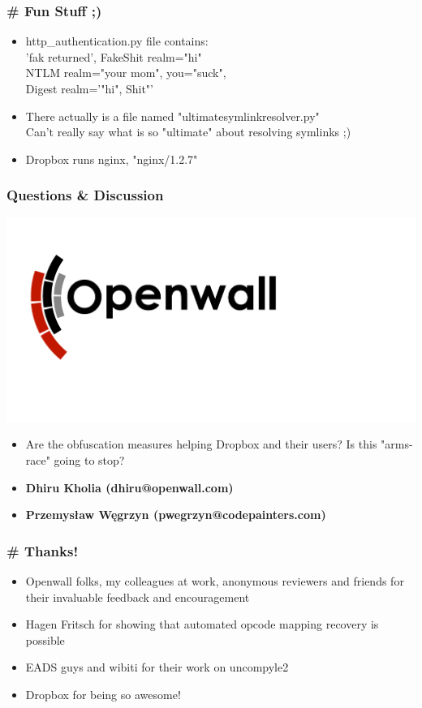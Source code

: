 \documentclass{beamer}
\begin{document}
\begin{frame}
\frametitle{\# Fun Stuff ;)}
\begin{itemize}
\itemsep 1em
\item http\_authentication.py file contains: \\
  \vspace{1em} 'fak returned', FakeShit realm="hi" \\
  \vspace{1em} NTLM realm="your mom", you="suck", \\
  \vspace{1em} Digest realm='"hi", Shit"' \\
\item There actually is a file named "ultimatesymlinkresolver.py" \\
  \vspace{1em} Can't really say what is so "ultimate" about resolving symlinks ;)
\item Dropbox runs nginx, "nginx/1.2.7"
\end{itemize}
\end{frame}

\begin{frame}
\frametitle{Questions \& Discussion}
\includegraphics[scale=0.16]{openwall-logo.png}
\begin{itemize}
\itemsep 2em
\item Are the obfuscation measures helping Dropbox and their users? Is this "arms-race" going to stop?
\item \bf{Dhiru Kholia (dhiru@openwall.com)}
\item \bf{Przemysław Węgrzyn (pwegrzyn@codepainters.com)}
\end{itemize}
\end{frame}

\begin{frame}
\frametitle{\# Thanks!}
\begin{itemize}
\itemsep 2.3em
\item Openwall folks, my colleagues at work, anonymous reviewers and friends
for their invaluable feedback and encouragement
\item Hagen Fritsch for showing that automated opcode mapping recovery is
possible
\item EADS guys and wibiti for their work on uncompyle2

\item Dropbox for being so awesome!
\end{itemize}
\end{frame}
\end{document}
